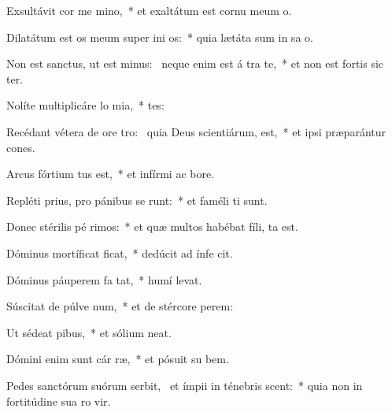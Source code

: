 \item Exsultávit cor me  mino,~* et exaltátum est cornu meum   o.
\item Dilatátum est os meum super ini os:~* quia lætáta sum in sa o.
\item Non est sanctus, ut est minus:~\pscross{} neque enim est á tra te,~* et non est fortis sic  ter.
\item Nolíte multiplicáre lo mia,~* tes:
\item Recédant vétera de ore tro:~\pscross{} quia Deus scientiárum,  est,~* et ipsi præparántur cones.
\item Arcus fórtium tus est,~* et infírmi ac  bore.
\item Repléti prius, pro pánibus se runt:~* et faméli ti sunt.
\item Donec stérilis pé rimos:~* et quæ multos habébat fíli, ta est.
\item Dóminus mortíficat  ficat,~* dedúcit ad ínfe  cit.
\item Dóminus páuperem fa  tat,~* humí  levat.
\item Súscitat de púlve num,~* et de stércore  perem:
\item Ut sédeat  pibus,~* et sólium  neat.
\item Dómini enim sunt cár ræ,~* et pósuit su  bem.
\item Pedes sanctórum suórum serbit,~\pscross{} et ímpii in ténebris scent:~* quia non in fortitúdine sua ro vir.
